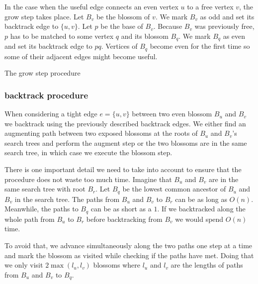 In the case when the useful edge connects an even vertex $u$ to a free vertex $v$, the grow step takes place. Let $B_v$ be the blossom of $v$. We mark $B_v$ as odd and set its backtrack edge to $\{u, v\}$. Let $p$ be the base of $B_v$. Because $B_v$ was previously free, $p$ has to be matched to some vertex $q$ and its blossom $B_q$. We mark $B_q$ as even and set its backtrack edge to $pq$. Vertices of $B_q$ become even for the first time so some of their adjacent edges might become useful.

\begin{algorithm}
\caption{The grow step procedure}\label{alg:grow_step}
\begin{algorithmic}[1]
\EndProcedure
\end{algorithmic}
\end{algorithm}

\subsubsection*{backtrack procedure}

When considering a tight edge $e=\{u, v\}$ between two even blossom $B_u$ and $B_v$ we backtrack using the previously described backtrack edges. We either find an augmenting path between two exposed blossoms at the roots of $B_u$ and $B_v$'s search trees and perform the augment step or the two blossoms are in the same search tree, in which case we execute the blossom step. 

There is one important detail we need to take into account to ensure that the procedure does not waste too much time. Imagine that $B_u$ and $B_v$ are in the same search tree with root $B_r$. Let $B_q$ be the lowest common ancestor of $B_u$ and $B_v$ in the search tree. The paths from $B_u$ and $B_v$ to $B_r$ can be as long as $O(n)$. Meanwhile, the paths to $B_q$ can be as short as a $1$. If we backtracked along the whole path from $B_u$ to $B_r$ before backtracking from $B_v$ we would spend $O(n)$ time. 

To avoid that, we advance simultaneously along the two paths one step at a time and mark the blossom as visited while checking if the paths have met. Doing that we only visit $2\max(l_u, l_v)$ blossoms where $l_u$ and $l_v$ are the lengths of paths from $B_u$ and $B_v$ to $B_q$.


